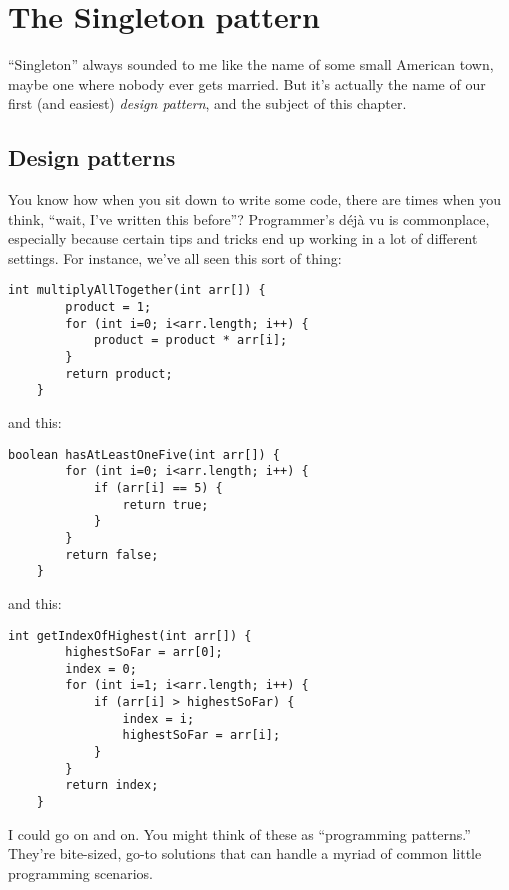 
\chapter{The Singleton pattern}

``Singleton'' always sounded to me like the name of some small American town,
maybe one where nobody ever gets married. But it's actually the name of our
first (and easiest) \textit{design pattern}, and the subject of this chapter.

\section{Design patterns}

You know how when you sit down to write some code, there are times when you
think, ``wait, I've written this before''? Programmer's d\'{e}j\`{a} vu is
commonplace, especially because certain tips and tricks end up working in
a lot of different settings. For instance, we've all seen this sort of thing:

\vspace{-.1in}
\begin{Verbatim}[fontsize=\small]
    int multiplyAllTogether(int arr[]) {
        product = 1;
        for (int i=0; i<arr.length; i++) {
            product = product * arr[i];
        }
        return product;
    }
\end{Verbatim}

and this:

\pagebreak
\begin{Verbatim}[fontsize=\small]
    boolean hasAtLeastOneFive(int arr[]) {
        for (int i=0; i<arr.length; i++) {
            if (arr[i] == 5) {
                return true;
            }
        }
        return false;
    }
\end{Verbatim}

and this:

\begin{samepage}
\begin{Verbatim}[fontsize=\small]
    int getIndexOfHighest(int arr[]) {
        highestSoFar = arr[0];
        index = 0;
        for (int i=1; i<arr.length; i++) {
            if (arr[i] > highestSoFar) {
                index = i;
                highestSoFar = arr[i];
            }
        }
        return index;
    }
\end{Verbatim}
\end{samepage}

I could go on and on. You might think of these as ``programming patterns.''
They're bite-sized, go-to solutions that can handle a myriad of common little
programming scenarios.

